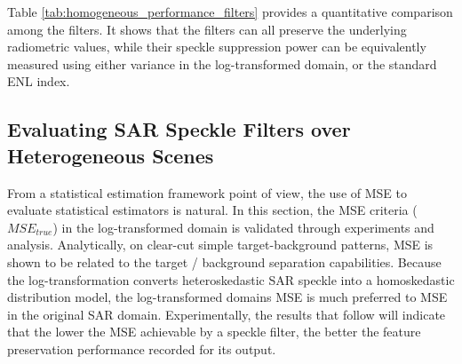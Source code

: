 Table \ref{tab:homogeneous_performance_filters} provides a quantitative comparison among the filters.
It shows that the filters can all preserve the underlying radiometric values, while their speckle suppression power can be equivalently measured using either variance in the log-transformed domain, or the standard ENL index.

\afterpage{\clearpage}

\subsection{ Evaluating SAR Speckle Filters over Heterogeneous Scenes }
\label{sec:eval_hetero}

From a statistical estimation framework point of view, the use of MSE to evaluate statistical estimators is natural.
In this section, the MSE criteria ($MSE_{true}$) in the log-transformed domain is validated through experiments and analysis. 
Analytically, on clear-cut simple target-background patterns, MSE is shown to be related to the target / background separation capabilities. 
Because the log-transformation converts heteroskedastic SAR speckle into a homoskedastic distribution model, 
	the log-transformed domains MSE is much preferred to MSE in the original SAR domain.
Experimentally, the results that follow will indicate that
	the lower the MSE achievable by a speckle filter,
	the better the feature preservation performance recorded for its output.

%

